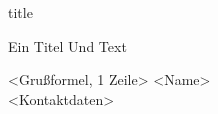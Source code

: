 \begin{frame}{title}
\end{frame}

\begin{logoframe}{Ein Titel}
Und Text
\end{logoframe}


\begin{finalframe}{\textless{}Grußformel, 1 Zeile\textgreater}
\textless{}Name\textgreater\\
\textless{}Kontaktdaten\textgreater
\end{finalframe}


